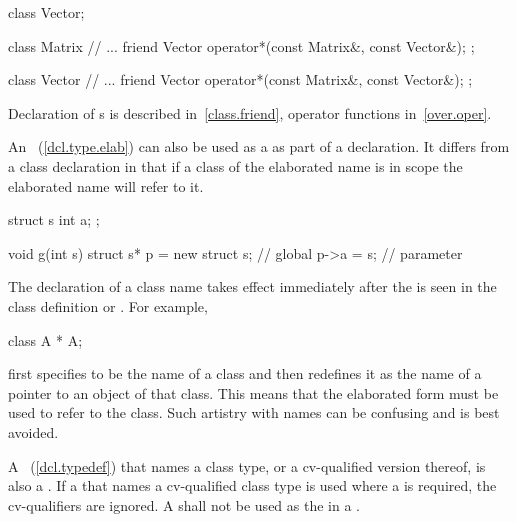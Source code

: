 \begin{codeblock}
class Vector;

class Matrix {
  // ...
  friend Vector operator*(const Matrix&, const Vector&);
};

class Vector {
  // ...
  friend Vector operator*(const Matrix&, const Vector&);
};
\end{codeblock}

Declaration of s is described in~\ref{class.friend},
operator functions in~\ref{over.oper}.
\exitexample
\exitnote

\pnum
{}%
%
\enternote
An ~(\ref{dcl.type.elab}) can also
be used as a  as part of a declaration. It
differs from a class declaration in that if a class of the elaborated
name is in scope the elaborated name will refer to it.
\exitnote
\enterexample

\begin{codeblock}
struct s { int a; };

void g(int s) {
  struct s* p = new struct s;   // global 
  p->a = s;                     // parameter 
}
\end{codeblock}
\exitexample

\pnum
{}%
\enternote
The declaration of a class name takes effect immediately after the
 is seen in the class definition or
. For example,

\begin{codeblock}
class A * A;
\end{codeblock}

first specifies  to be the name of a class and then redefines
it as the name of a pointer to an object of that class. This means that
the elaborated form   must be used to refer to the
class. Such artistry with names can be confusing and is best avoided.
\exitnote

\pnum
{}%
A ~(\ref{dcl.typedef}) that names a class type,
or a cv-qualified version thereof, is also a . If a
 that names a cv-qualified class type is used
where a  is required, the cv-qualifiers are
ignored. A  shall not be used as the
 in a .


